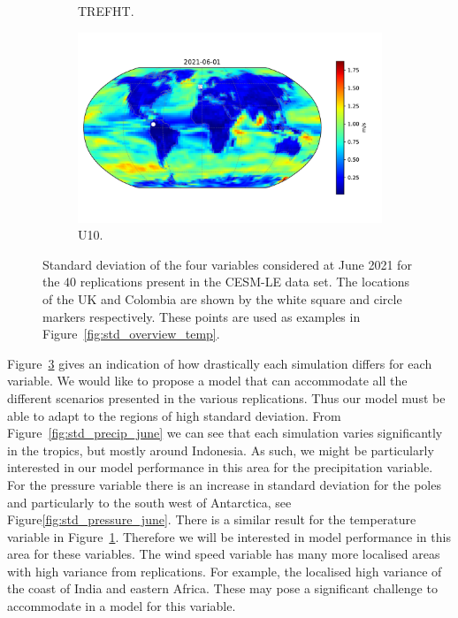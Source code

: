 \begin{figure}[htbp!]
\begin{subfigure}[b]{0.45\textwidth}
		\caption{TREFHT.}
		\label{fig:std_temp_june}   
	\end{subfigure}             
	\begin{subfigure}[b]{0.45\textwidth}
		\includegraphics[width=\textwidth]{U10_std}
		\caption{U10.}
		\label{fig:std_wind_june}
	\end{subfigure}             
	\caption[Spatial overview of variability of Precipitation, Pressure, Temperature, and Wind speed from the CESM-LE dataset.]{ Standard deviation of the four variables considered at June 2021 for the $40$ replications present in the CESM-LE data set. The locations of the UK and Colombia are shown by the white square and circle markers respectively. These points are used as examples in Figure~\ref{fig:std_overview_temp}. }
	\label{fig:std_overview}
\end{figure}

Figure~\ref{fig:std_overview} gives an indication of how drastically each simulation differs for each variable.
We would like to propose a model that can accommodate all the different scenarios presented in the various replications. 
Thus our model must be able to adapt to the regions of high standard deviation. 
From Figure~\ref{fig:std_precip_june} we can see that each simulation varies significantly in the tropics, but mostly around Indonesia.
As such, we might be particularly interested in our model performance in this area for the precipitation variable.
For the pressure variable there is an increase in standard deviation for the poles and particularly to the south west of Antarctica, see Figure\ref{fig:std_pressure_june}.
There is a similar result for the temperature variable in Figure~\ref{fig:std_temp_june}.
Therefore we will be interested in model performance in this area for these variables.
The wind speed variable has many more localised areas with high variance from replications.
For example, the localised high variance of the coast of India and eastern Africa.  
These may pose a significant challenge to accommodate in a model for this variable.

